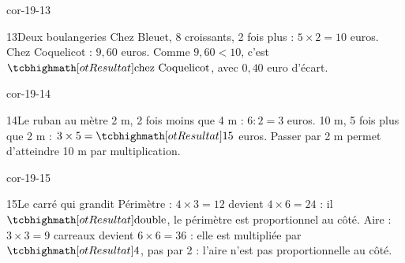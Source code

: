 \begin{blocLivre}{cor-19-13}\begin{corrige}{13}{Deux boulangeries}
Chez Bleuet, 8 croissants, 2 fois plus : $5\times2=10$ euros. Chez Coquelicot : $9{,}60$ euros. Comme $9{,}60<10$, c’est $\res{\text{chez Coquelicot}}$, avec $0{,}40$ euro d’écart.
\end{corrige}\end{blocLivre}
\begin{blocLivre}{cor-19-14}\begin{corrige}{14}{Le ruban au mètre}
2 m, 2 fois moins que 4 m : $6:2=3$ euros. 10 m, 5 fois plus que 2 m : $3\times5=\res{15}$ euros. Passer par 2 m permet d’atteindre 10 m par multiplication.
\end{corrige}\end{blocLivre}
\begin{blocLivre}{cor-19-15}\begin{corrige}{15}{Le carré qui grandit}
Périmètre : $4\times3=12$ devient $4\times6=24$ : il $\res{\text{double}}$, le périmètre est proportionnel au côté. Aire : $3\times3=9$ carreaux devient $6\times6=36$ : elle est multipliée par $\res4$, pas par 2 : l’aire n’est pas proportionnelle au côté.
\end{corrige}\end{blocLivre}
